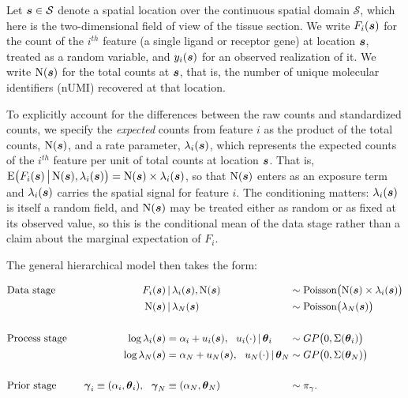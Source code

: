 \documentclass[10pt,letterpaper]{article}
\begin{document}
Let $\mbox{\boldmath $s$}\in\mathcal{S}$ denote a spatial location over the continuous spatial domain $\mathcal{S}$, which here is the two-dimensional field of view of the tissue section. We write $F_i(\mbox{\boldmath $s$})$ for the count of the $i^{th}$ feature (a single ligand or receptor gene) at location $\mbox{\boldmath $s$}$, treated as a random variable, and $y_i(\mbox{\boldmath $s$})$ for an observed realization of it. We write $\mbox{N}(\mbox{\boldmath $s$})$ for the total counts at $\mbox{\boldmath $s$}$, that is, the number of unique molecular identifiers (nUMI) recovered at that location.

To explicitly account for the differences between the raw counts and standardized counts, we specify the \textit{expected} counts from feature $i$ as the product of the total counts, $\mbox{N}(\mbox{\boldmath $s$})$, and a rate parameter, $\lambda_i(\mbox{\boldmath $s$})$, which represents the expected counts of the $i^{th}$ feature per unit of total counts at location $\mbox{\boldmath $s$}$. That is, $\mbox{E}\big(F_i(\mbox{\boldmath $s$})\,\big|\,\mbox{N}(\mbox{\boldmath $s$}), \lambda_i(\mbox{\boldmath $s$})\big) = \mbox{N}(\mbox{\boldmath $s$})\times \lambda_i(\mbox{\boldmath $s$})$, so that $\mbox{N}(\mbox{\boldmath $s$})$ enters as an exposure term and $\lambda_i(\mbox{\boldmath $s$})$ carries the spatial signal for feature $i$. The conditioning matters: $\lambda_i(\mbox{\boldmath $s$})$ is itself a random field, and $\mbox{N}(\mbox{\boldmath $s$})$ may be treated either as random or as fixed at its observed value, so this is the conditional mean of the data stage rather than a claim about the marginal expectation of $F_i$.

The general hierarchical model then takes the form:

\begin{equation}
\label{eq:one-feat-model}
\begin{alignedat}{999}
& \mbox{Data stage} & F_i(\bs) & \, | \, \lambda_i(\bs), \N(\bs) &&\sim \mbox{Poisson}\big( \N(\bs)\times\lambda_i(\bs)\big)\\
& & \N(\bs) & \, | \, \lambda_N(\bs) &&\sim \mbox{Poisson}\big( \lambda_N(\bs)\big)\\
&&&&&\\
&\mbox{Process stage} \ \ \ \ \ & \mbox{log}\,\lambda_i(\bs)& = \alpha_i + u_i(\bs), \ \ u_i(\cdot)\,|\,\btheta_i &&\sim GP\big(0, \Sigma(\btheta_i)\big)\\
&\ \ \ \ \ & \mbox{log}\,\lambda_N(\bs)& = \alpha_N + u_N(\bs), \ \ u_N(\cdot)\,|\,\btheta_N &&\sim GP\big(0, \Sigma(\btheta_N)\big)\\
&&&&&\\
&\mbox{Prior stage} & \bgamma_i \equiv (\alpha_i,\btheta_i), \ \ \bgamma_N &\equiv (\alpha_N,\btheta_N) &&\sim \pi_\gamma.
\end{alignedat}
\end{equation}
\end{document}
